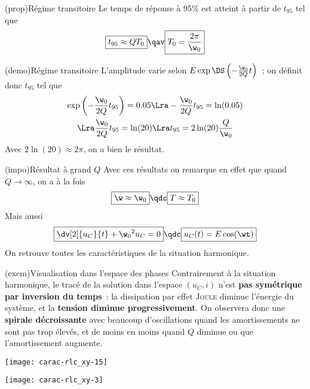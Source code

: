 \documentclass[../../main/main.tex]{subfiles}
\begin{document}
\begin{tcbraster}[raster columns=2, raster equal height=rows]
	\begin{tcb}[label=prop:transipseudo](prop){Régime transitoire}
		Le temps de réponse à 95\% est atteint à partir de $t_{95}$ tel que
		\begin{equation*}
			\boxed{t_{95} \approx QT_0} \qav \boxed{T_0 = \frac{2\pi}{\w_0}}
		\end{equation*}
	\end{tcb}
	\begin{tcb}[label=demo:transipseudo](demo){Régime transitoire}
		L'amplitude varie selon $E\exp \DS \left( -\frac{\w_0}{2Q}t \right)$~; on
		définit donc $t_{95}$ tel que
		\begin{gather*}
			\exp \left(-\frac{\w_0}{2Q}t_{95} \right) = 0.05
			\Lra - \frac{\w_0}{2Q}t_{95} = \ln(0.05)\\
			\Lra \frac{\w_0}{2Q}t_{95} = \ln(20)
			\Lra t_{95} = 2\ln(20) \frac{Q}{\w_0}
		\end{gather*}
		Avec $2\ln(20) \approx 2\pi$, on a bien le résultat.
	\end{tcb}
\end{tcbraster}

\begin{tcb}[label=impo:pseudograndQ](impo){Résultat à grand $Q$}
	Avec ces résultats on remarque en effet que quand $Q \rightarrow \infty$, on
	a à la fois
	\begin{equation*}
		\boxed{\w \approx \w_0} \qdc \boxed{T \approx T_0}
	\end{equation*}
	Mais aussi
	\begin{equation*}
		\boxed{\dv[2]{u_C}{t} + \w_0{}^2u_C = 0} \qdc \boxed{u_C(t) = E\cos(\wt)}
	\end{equation*}
	On retrouve toutes les caractéristiques de la situation harmonique.
\end{tcb}

\begin{tcb}[width=\linewidth, sidebyside, hand](exem){Visualisation dans l'espace des phases}
	Contrairement à la situation harmonique, le tracé de la solution dans
	l'espace $(u_C,i)$ n'est \textbf{pas symétrique par inversion du temps}~: la
	dissipation par effet \textsc{Joule} diminue l'énergie du système, et la
	\textbf{tension diminue progressivement}. On observera donc une
	\textbf{spirale décroissante} avec beaucoup d'oscillations quand les
	amortissements ne sont pas trop élevés, et de moins en moins quand $Q$
	diminue ou que l'amortissement augmente.
	\tcblower
	\begin{minipage}{0.49\linewidth}
		\begin{center}
			\texttt{[image: carac-rlc\_xy-15]}
		\end{center}
	\end{minipage}
	\begin{minipage}{0.49\linewidth}
		\begin{center}
			\texttt{[image: carac-rlc\_xy-3]}
		\end{center}
	\end{minipage}
\end{tcb}
\end{document}
